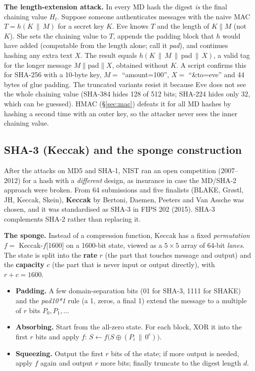 \textbf{The length-extension attack.} In every MD hash the digest \emph{is} the final chaining value $H_t$. Suppose someone authenticates messages with the naive MAC $T = h(K \,\|\, M)$ for a secret key $K$. Eve knows $T$ and the length of $K \| M$ (not $K$). She sets the chaining value to $T$, appends the padding block that $h$ would have added (computable from the length alone; call it \emph{pad}), and continues hashing any extra text $X$. The result equals $h(K \,\|\, M \,\|\, \text{pad} \,\|\, X)$, a valid tag for the longer message $M \| \text{pad} \| X$, obtained without $K$. A script confirms this for SHA-256 with a 10-byte key, $M = $ ``amount=100'', $X = $ ``\&to=eve'' and 44 bytes of glue padding. The truncated variants resist it because Eve does not see the whole chaining value (SHA-384 hides 128 of 512 bits; SHA-224 hides only 32, which can be guessed). HMAC (\S\ref{sec:mac}) defeats it for all MD hashes by hashing a second time with an outer key, so the attacker never sees the inner chaining value.

\subsection{SHA-3 (Keccak) and the sponge construction \new}

After the attacks on MD5 and SHA-1, NIST ran an open competition (2007--2012) for a hash with a \emph{different} design, as insurance in case the MD/SHA-2 approach were broken. From 64 submissions and five finalists (BLAKE, Gr{\o}stl, JH, Keccak, Skein), \textbf{Keccak} by Bertoni, Daemen, Peeters and Van Assche was chosen, and it was standardised as SHA-3 in FIPS 202 (2015). SHA-3 complements SHA-2 rather than replacing it.

\textbf{The sponge.} Instead of a compression function, Keccak has a fixed \emph{permutation} $f = $ Keccak-$f$[1600] on a 1600-bit state, viewed as a $5 \times 5$ array of 64-bit \emph{lanes}. The state is split into the \textbf{rate} $r$ (the part that touches message and output) and the \textbf{capacity} $c$ (the part that is never input or output directly), with $r + c = 1600$.
\begin{itemize}[leftmargin=1.4em]
  \item \textbf{Padding.} A few domain-separation bits (01 for SHA-3, 1111 for SHAKE) and the \emph{pad10*1} rule (a 1, zeros, a final 1) extend the message to a multiple of $r$ bits $P_0, P_1, \dots$
  \item \textbf{Absorbing.} Start from the all-zero state. For each block, XOR it into the first $r$ bits and apply $f$: $S \leftarrow f\big(S \oplus (P_i \,\|\, 0^c)\big)$.
  \item \textbf{Squeezing.} Output the first $r$ bits of the state; if more output is needed, apply $f$ again and output $r$ more bits; finally truncate to the digest length $d$.
\end{itemize}

